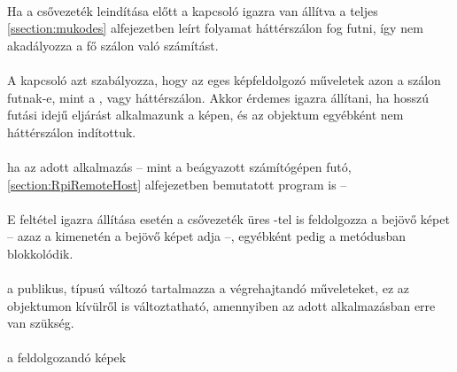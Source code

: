 \paragraph{} Ha a csővezeték leindítása előtt a kapcsoló igazra van állítva a teljes \ref{ssection:mukodes} alfejezetben leírt folyamat háttérszálon fog futni, így nem akadályozza a fő szálon való számítást.

\paragraph{} A kapcsoló azt szabályozza, hogy az eges képfeldolgozó műveletek azon a szálon futnak-e, mint a , vagy háttérszálon. Akkor érdemes igazra állítani, ha hosszú futási idejű eljárást alkalmazunk a képen, és az objektum egyébként nem háttérszálon indítottuk.

\paragraph{} ha az adott alkalmazás -- mint a beágyazott számítógépen futó, \ref{section:RpiRemoteHost} alfejezetben bemutatott program is -- 

\paragraph{}

\paragraph{} E feltétel igazra állítása esetén a csővezeték üres -tel is feldolgozza a bejövő képet -- azaz a kimenetén a bejövő képet adja --, egyébként pedig a  metódusban blokkolódik.

\paragraph{} a publikus,  típusú változó tartalmazza a végrehajtandó műveleteket, ez az objektumon kívülről is változtatható, amennyiben az adott alkalmazásban erre van szükség.

\paragraph{} a feldolgozandó képek 

